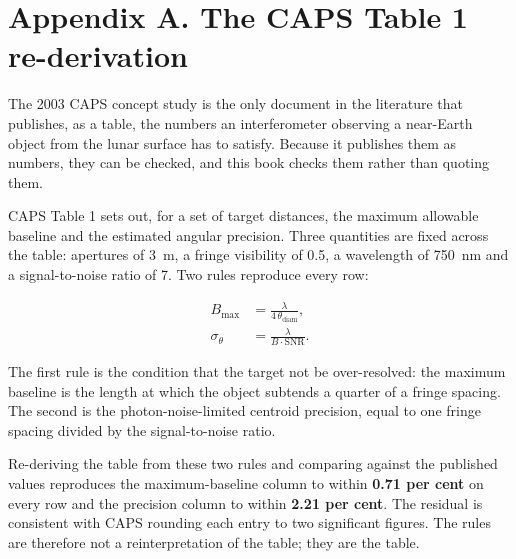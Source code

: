 \chapter*{Appendix A. The CAPS Table 1 re-derivation}
\thispagestyle{plain}

The 2003 CAPS concept study is the only document in the literature that
publishes, as a table, the numbers an interferometer observing a near-Earth
object from the lunar surface has to satisfy. Because it publishes them as
numbers, they can be checked, and this book checks them rather than quoting
them.

CAPS Table 1 sets out, for a set of target distances, the maximum allowable
baseline and the estimated angular precision. Three quantities are fixed
across the table: apertures of 3~m, a fringe visibility of 0.5, a
wavelength of 750~nm and a signal-to-noise ratio of 7. Two rules reproduce
every row:

\begin{align}
B_{\max} &= \frac{\lambda}{4\,\theta_{\mathrm{diam}}}, \\
\sigma_{\theta} &= \frac{\lambda}{B \cdot \mathrm{SNR}}.
\end{align}

The first rule is the condition that the target not be over-resolved: the
maximum baseline is the length at which the object subtends a quarter of a
fringe spacing. The second is the photon-noise-limited centroid precision,
equal to one fringe spacing divided by the signal-to-noise ratio.

Re-deriving the table from these two rules and comparing against the
published values reproduces the maximum-baseline column to within
\textbf{0.71 per cent} on every row and the precision column to within
\textbf{2.21 per cent}. The residual is consistent with CAPS rounding each
entry to two significant figures. The rules are therefore not a
reinterpretation of the table; they are the table.

